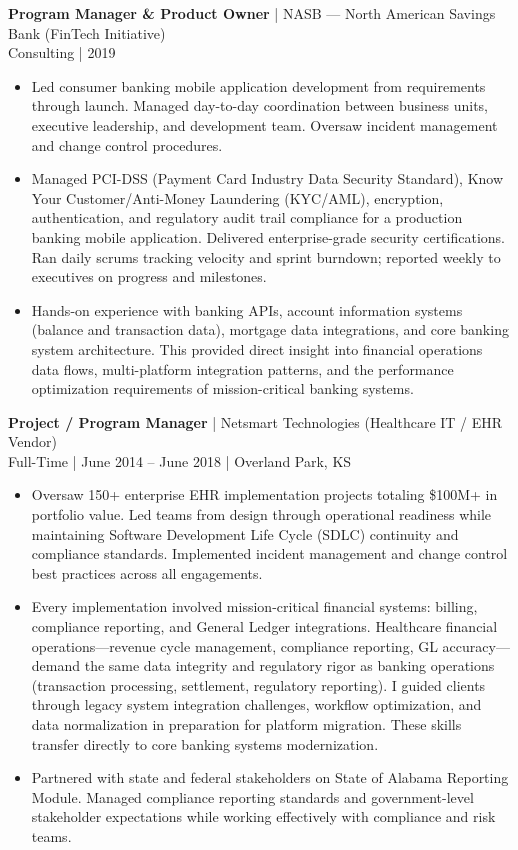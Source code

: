 \documentclass[10pt]{article}
\begin{document}
\noindent
\textbf{Program Manager \& Product Owner} | NASB --- North American Savings Bank (FinTech Initiative)\\
Consulting | 2019
\begin{itemize}
  \setlength\itemsep{0.05in}
  \item Led consumer banking mobile application development from requirements through launch. Managed day-to-day coordination between business units, executive leadership, and development team. Oversaw incident management and change control procedures.

  \item Managed PCI-DSS (Payment Card Industry Data Security Standard), Know Your Customer/Anti-Money Laundering (KYC/AML), encryption, authentication, and regulatory audit trail compliance for a production banking mobile application. Delivered enterprise-grade security certifications. Ran daily scrums tracking velocity and sprint burndown; reported weekly to executives on progress and milestones.

  \item Hands-on experience with banking APIs, account information systems (balance and transaction data), mortgage data integrations, and core banking system architecture. This provided direct insight into financial operations data flows, multi-platform integration patterns, and the performance optimization requirements of mission-critical banking systems.
\end{itemize}

\noindent
\textbf{Project / Program Manager} | Netsmart Technologies (Healthcare IT / EHR Vendor)\\
Full-Time | June 2014 – June 2018 | Overland Park, KS
\begin{itemize}
  \setlength\itemsep{0.05in}
  \item Oversaw 150+ enterprise EHR implementation projects totaling \$100M+ in portfolio value. Led teams from design through operational readiness while maintaining Software Development Life Cycle (SDLC) continuity and compliance standards. Implemented incident management and change control best practices across all engagements.

  \item Every implementation involved mission-critical financial systems: billing, compliance reporting, and General Ledger integrations. Healthcare financial operations---revenue cycle management, compliance reporting, GL accuracy---demand the same data integrity and regulatory rigor as banking operations (transaction processing, settlement, regulatory reporting). I guided clients through legacy system integration challenges, workflow optimization, and data normalization in preparation for platform migration. These skills transfer directly to core banking systems modernization.

  \item Partnered with state and federal stakeholders on State of Alabama Reporting Module. Managed compliance reporting standards and government-level stakeholder expectations while working effectively with compliance and risk teams.
\end{itemize}
\end{document}
